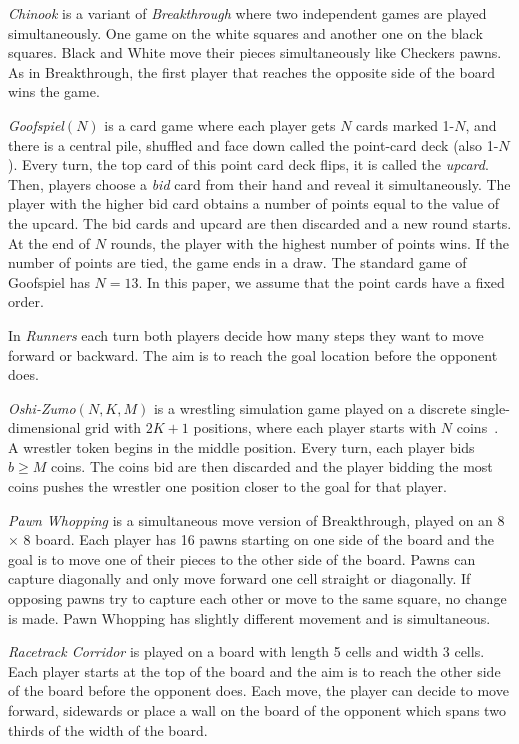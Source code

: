 \documentclass[conference]{IEEEtran}
\begin{document}
\textit{Chinook} is a variant of \textit{Breakthrough} where two independent games are played simultaneously. 
One game on the white squares and another one on the black squares. Black and White move their pieces simultaneously 
like Checkers pawns. As in Breakthrough, the first player that reaches the opposite side of the board wins the game. 

\textit{Goofspiel}$(N)$ is a card game where each player gets $N$ cards marked 1-$N$, and there is a central pile, 
shuffled and face down called the point-card deck (also 1-$N$). Every turn, the top card of this point card deck flips, 
it is called the {\it upcard}. Then, players choose a {\it bid} card from their hand and reveal it simultaneously. 
The player with the higher bid card obtains a number of points equal to the value of the upcard. The bid cards and 
upcard are then discarded and a new round starts. At the end of $N$ rounds, the player with the highest number of 
points wins. If the number of points are tied, the game ends in a draw. The standard game of Goofspiel has 
$N = 13$. In this paper, we assume that the point cards have a fixed order. 

In \textit{Runners} each turn both players decide how many steps they want to move forward or backward. The aim 
is to reach the goal location before the opponent does.

\textit{Oshi-Zumo}$(N,K,M)$ is a wrestling simulation game played on a discrete single-dimensional grid with 
$2K+1$ positions, where each player starts with $N$ coins~\cite{Buro03OshiZumo}. A wrestler token begins in the middle 
position. Every turn, 
each player bids $b \ge M$ coins. The coins bid are then discarded and the player bidding the most coins pushes the 
wrestler one position closer to the goal for that player. 

\textit{Pawn Whopping} is a simultaneous move version of Breakthrough, played on an 8 $\times$ 8 board. Each player has 
16 pawns starting on one side of the board and the goal is to move one of their pieces to the other side of the board. 
Pawns can capture diagonally and only move forward one cell straight or diagonally.
If opposing pawns try to capture each other or move to the same square, no change is made. 
Pawn Whopping has slightly different movement and is simultaneous.

\textit{Racetrack Corridor} is played on a board with length 5 cells and width 3 cells. Each player starts at the top of the board and the aim is to reach the other side of the board before the opponent does. Each move, the player can decide to move forward, sidewards or place a wall on the board of the opponent which spans two thirds of the width of the board.
\end{document}
